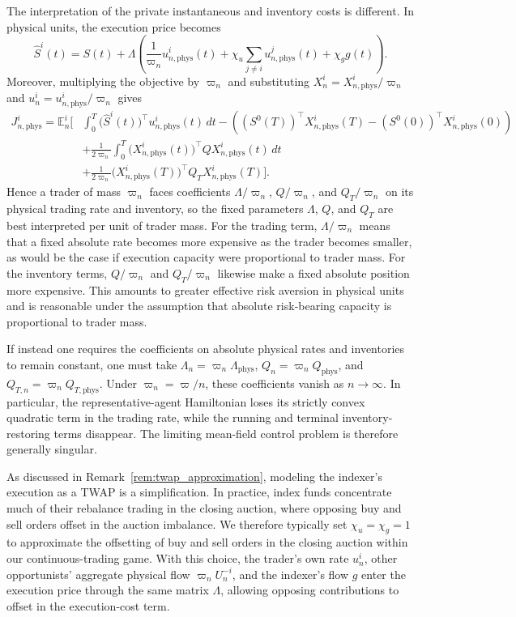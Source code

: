 \documentclass[12pt]{article}
\numberwithin{equation}{section}
\theoremstyle{definition}
\begin{document}
The interpretation of the private instantaneous and inventory costs is
different. In physical units, the execution price becomes
\[
\widehat S^i(t)
=
S(t)
+
\Lambda\left(
\frac{1}{\varpi_n}u_{n,\mathrm{phys}}^i(t)
+
\chi_u\sum_{j\ne i}u_{n,\mathrm{phys}}^j(t)
+
\chi_g g(t)
\right).
\]
Moreover, multiplying the objective by $\varpi_n$ and substituting
$X_n^i=X_{n,\mathrm{phys}}^i/\varpi_n$ and
$u_n^i=u_{n,\mathrm{phys}}^i/\varpi_n$ gives
\begin{align*}
J_{n,\mathrm{phys}}^i
=
\mathbb E_n^i\Bigg[
&
\int_0^T
\bigl(\widehat S^i(t)\bigr)^\top
u_{n,\mathrm{phys}}^i(t)\,dt
-
\left(
(S^0(T))^\top X_{n,\mathrm{phys}}^i(T)
-(S^0(0))^\top X_{n,\mathrm{phys}}^i(0)
\right)
\\
&
+
\frac{1}{2\varpi_n}\int_0^T
\bigl(X_{n,\mathrm{phys}}^i(t)\bigr)^\top
QX_{n,\mathrm{phys}}^i(t)\,dt
\\
&
+
\frac{1}{2\varpi_n}
\bigl(X_{n,\mathrm{phys}}^i(T)\bigr)^\top
Q_TX_{n,\mathrm{phys}}^i(T)
\Bigg].
\end{align*}
Hence a trader of mass $\varpi_n$ faces coefficients
$\Lambda/\varpi_n$, $Q/\varpi_n$, and $Q_T/\varpi_n$
on its physical trading rate and inventory, so the fixed parameters $\Lambda$,
$Q$, and $Q_T$ are best interpreted per unit of trader mass. For the trading
term, $\Lambda/\varpi_n$ means that a fixed absolute rate becomes more expensive as the
trader becomes smaller, as would be the case if execution capacity were
proportional to trader mass. For the inventory terms, $Q/\varpi_n$ and $Q_T/\varpi_n$ likewise
make a fixed absolute position more expensive. This amounts to greater
effective risk aversion in physical units and is reasonable under the assumption
that absolute risk-bearing capacity is proportional to trader mass.

If instead one requires the coefficients on absolute physical rates and
inventories to remain constant, one must take
$\Lambda_n=\varpi_n\Lambda_{\mathrm{phys}}$,
$Q_n=\varpi_nQ_{\mathrm{phys}}$, and
$Q_{T,n}=\varpi_nQ_{T,\mathrm{phys}}$. Under $\varpi_n=\varpi/n$,
these coefficients vanish as $n\to\infty$. In particular, the representative-agent Hamiltonian loses its
strictly convex quadratic term in the trading rate, while the running and
terminal inventory-restoring terms disappear. The limiting mean-field control
problem is therefore generally singular.

As discussed in Remark~\ref{rem:twap_approximation}, modeling the indexer's execution as a TWAP
is a simplification. In practice, index funds concentrate much of their
rebalance trading in the closing auction, where opposing buy and sell orders
offset in the auction imbalance. We therefore typically set $\chi_u=\chi_g=1$
to approximate the offsetting of buy and sell orders in the closing auction
within our continuous-trading game. With this choice, the trader's own rate
$u_n^i$, other opportunists' aggregate physical flow $\varpi_nU_n^{-i}$, and
the indexer's flow $g$ enter the execution price through the same matrix
$\Lambda$, allowing opposing contributions to offset in the execution-cost term.
\end{document}
